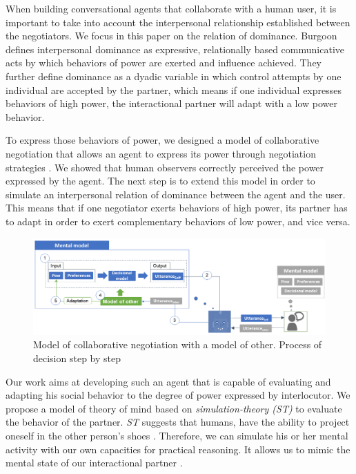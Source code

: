 \documentclass[conference, letterpaper]{IEEEtran}
\begin{document}
		When building conversational agents that collaborate with a human user, it is important to take into account the interpersonal relationship established between the negotiators.
		 We focus in this paper on the relation of dominance. Burgoon \cite{burgoon1998nature} defines interpersonal dominance as expressive, relationally based communicative acts by which behaviors of power are exerted and influence achieved. They further define dominance as a dyadic variable in which control attempts by one individual are accepted by the partner, which means if one individual expresses behaviors of high power, the interactional partner will adapt with a low power behavior. 
	
		To express those behaviors of power, we designed a model of collaborative negotiation that allows an agent to express its power through negotiation strategies \cite{ouali2017computational}. We showed that human observers correctly perceived the power expressed by the agent.
		The next step is to extend this model in order to simulate an interpersonal relation of dominance between the agent and the user. This means that if one negotiator exerts behaviors of high power, its partner has to adapt in order to exert complementary behaviors of low power, and vice versa.
		
		\begin{figure}[h]
			\centering
			\includegraphics[width=0.8\linewidth]{figs/model/general.png}
			\caption{Model of collaborative negotiation with a model of other. Process of decision step by step} 
			\label{fig:schema-general}
		\end{figure} 

	
		Our work aims at developing such an agent that is capable of evaluating and adapting his social behavior to the degree of power expressed by interlocutor. We propose a model of theory of mind based on \emph{simulation-theory (ST)} \cite{gordon1986folk} to evaluate the behavior of the partner. \emph{ST} suggests that humans, have the ability to project oneself in the other person’s shoes \cite{shanton2010simulation}. Therefore, we can simulate his or her mental activity with our own capacities for practical reasoning. It allows us to mimic the mental state of our interactional partner \cite{harbers2009modeling}.%
		  
\end{document}
